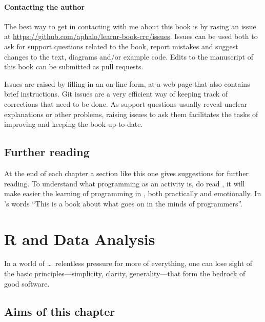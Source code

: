 \documentclass[krantz2]{krantz}\usepackage{knitr}
\begin{document}
\subsubsection*{Contacting the author}

The best way to get in contacting with me about this book is by rasing an issue at \url{https://github.com/aphalo/learnr-book-crc/issues}. Issues can be used both to ask for support questions related to the book, report mistakes and suggest changes to the text, diagrams and/or example code. Edits to the manuscript of this book can be submitted as pull requests.

Issues are raised by filling-in an on-line form, at a web page that also contains brief instructions. Git issues are a very efficient way of keeping track of corrections that need to be done. As support questions usually reveal unclear explanations or other problems, raising issues to ask them facilitates the tasks of improving and keeping the book up-to-date.

\section{Further reading}

At the end of each chapter a section like this one gives suggestions for further reading. To understand what programming as an activity is, do read  \autocite{Burns2012}, it will make easier the learning of programming in \Rlang, both practically and emotionally. In \citeauthor{Burns2012}'s words ``This is a book about what goes on in the minds of programmers''.






\chapter{R and Data Analysis}\label{chap:R:introduction}

\begin{VF}
In a world of \ldots\ relentless pressure for more of everything, one can lose sight of the basic principles---simplicity, clarity, generality---that form the bedrock of good software.

\nocite{Kernighan1999}
\end{VF}

\section{Aims of this chapter}
\end{document}
